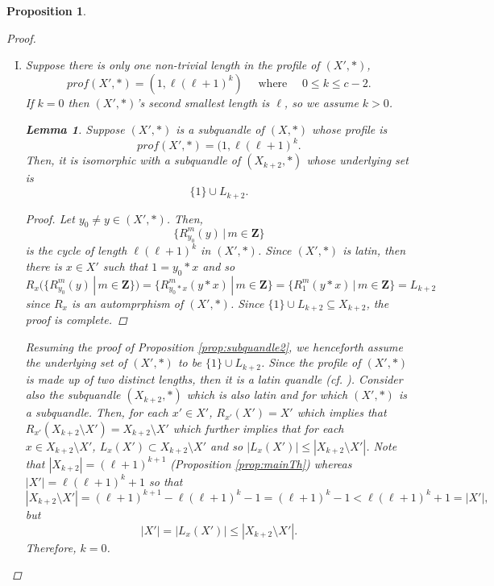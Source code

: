 \documentclass{article}
\newtheorem{lemma}[theorem]{Lemma}
\newtheorem{proposition}[theorem]{Proposition}
\begin{document}
\begin{proposition}
\begin{proof}
\begin{enumerate}[I.]
\item Suppose there is only one non-trivial length in the profile of $(X', \ast)$, $$prof(X', \ast)= (1, \ell(\ell+1)^k) \quad \text{ where } \quad 0\leq k \leq c-2 .$$ If $k=0$ then $(X', \ast)$'s second smallest length is $\ell$, so we assume $k>0$.
\begin{lemma}
Suppose $(X',*)$ is a subquandle of $(X, *)$ whose profile is $$prof(X',*)=(1, \ell(\ell +1)^k .$$ Then, it is isomorphic with a subquandle of $(X_{k+2},*)$ whose underlying set is $$\{ 1 \} \cup L_{k+2} .$$
\end{lemma}
\begin{proof}
Let $y_0\neq y \in (X',*)$. Then, $$\{ R_{y_0}^m(y)\,|\, m\in \mathbf{Z}  \}$$ is the cycle of length $\ell (\ell +1)^k$ in $(X',*)$. Since $(X',*)$ is latin, then there is $x\in X'$ such that $1=y_0*x$ and so $$R_x\big( \{ R_{y_0}^m(y)\,|\, m\in \mathbf{Z} \}\big)=\{ R_{y_0*x}^m(y*x)\,|\, m\in \mathbf{Z}  \}=\{ R_{1}^m(y*x)\,|\, m\in \mathbf{Z}  \}=L_{k+2}$$ since $R_x$ is an automprphism of $(X',*)$. Since $\{ 1 \} \cup L_{k+2} \subseteq X_{k+2}$, the proof is complete.
\end{proof}
Resuming the proof of Proposition \ref{prop:subquandle2}, we henceforth assume the underlying set of $(X',*)$ to be $\{ 1 \} \cup L_{k+2}$.
     Since the profile of $(X', \ast)$ is made up of two distinct lengths, then it is a latin quandle (cf. \cite{Lages_Lopes_Vojtěchovský}). Consider also the subquandle $(X_{k+2}, \ast)$ which is also latin and for which  $(X', \ast)$ is a subquandle. Then, for each $x'\in X'$, $R_{x'}(X')=X'$ which implies that $R_{x'}(X_{k+2}\setminus X')=X_{k+2}\setminus X'$ which further implies that for each $x\in X_{k+2}\setminus X'$,
$L_x(X')\subset X_{k+2}\setminus X'$ and so $|L_x(X')|\leq |X_{k+2}\setminus X'|$. Note that $|X_{k+2}|=(\ell+1)^{k+1}$ (Proposition \ref{prop:mainTh}) whereas $|X'|=\ell(\ell+1)^{k}+1$ so that $$|X_{k+2}\setminus X'|=(\ell+1)^{k+1}-\ell(\ell+1)^{k}-1=(\ell+1)^{k}-1<\ell(\ell+1)^{k}+1=|X'| ,$$but $$|X'|=|L_x(X')|\leq |X_{k+2}\setminus X'| .$$ Therefore, $k=0$.




\end{enumerate}
\end{proof}
\end{proposition}
\end{document}
